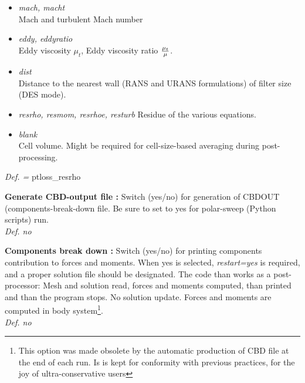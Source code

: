 \documentclass[12pt,epsf,colordvi]{article}
\begin{document}
\begin{description}
\begin{itemize}
%
			\item	{\it mach, macht } \\
Mach and turbulent Mach number
%
			\item	{\it  eddy, eddyratio} \\
Eddy viscosity \(\mu_t \), Eddy viscosity ratio \({\mu_t \over \mu}  \).
%
			\item	{\it dist } \\
Distance to the nearest wall (RANS and URANS formulations) of filter size (DES mode).
%
			\item {\it resrho, resmom, resrhoe, resturb }
Residue of the various equations.
%
			\item	{\it blank } \\
Cell volume. Might be required for cell-size-based averaging during post-processing.
%
		\end{itemize}	
	{\it Def. = } ptloss\_resrho
%
		      \item{\bf Generate CBD-output file :} Switch (yes/no) for generation of CBDOUT (components-break-down 
			file. Be sure to set to yes for polar-sweep (Python scripts) run. \\
{\it Def.   no }
%
			\item {\bf Components break down :} Switch (yes/no) for printing components contribution to forces and moments. When yes is selected, {\it restart=yes} is required, and a proper solution file should be designated. The code than works as a post-processor: Mesh and solution read, forces and moments computed, than printed and than the program stops. No solution update. Forces and moments are computed in body system\footnote{This option was made obsolete by the automatic production of CBD file at the end of each run. Is is kept for conformity with previous practices, for the joy of ultra-conservative users}. \\
{\it Def.   no }
%
 \end{description}
%
%
\noindent 
\end{document}
